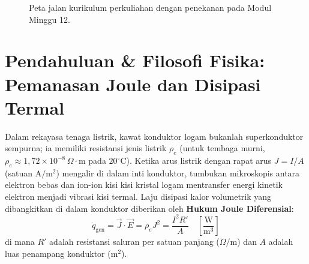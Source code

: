 \documentclass[11pt,a4paper]{article}
\theoremstyle{definition}
\begin{document}
\begin{figure}[htbp]
{%
}
\caption{Peta jalan kurikulum perkuliahan dengan penekanan pada Modul Minggu 12.}
\label{fig:peta_jalan_pd_w12}
\end{figure}

\section{Pendahuluan \& Filosofi Fisika: Pemanasan Joule dan Disipasi Termal}

Dalam rekayasa tenaga listrik, kawat konduktor logam bukanlah superkonduktor sempurna; ia memiliki resistansi jenis listrik $\rho_e$ (untuk tembaga murni, $\rho_e \approx 1{,}72 \times 10^{-8}\,\Omega\cdot\text{m}$ pada $20^\circ\text{C}$). Ketika arus listrik dengan rapat arus $J = I/A$ (satuan $\text{A}/\text{m}^2$) mengalir di dalam inti konduktor, tumbukan mikroskopis antara elektron bebas dan ion-ion kisi kisi kristal logam mentransfer energi kinetik elektron menjadi vibrasi kisi termal. Laju disipasi kalor volumetrik yang dibangkitkan di dalam konduktor diberikan oleh \textbf{Hukum Joule Diferensial}:
\begin{equation}
    \dot{q}_{\text{gen}} = \vec{J} \cdot \vec{E} = \rho_e J^2 = \frac{I^2 R'}{A}\quad \left[\frac{\text{W}}{\text{m}^3}\right]
    \label{eq:joule_heat_gen}
\end{equation}
di mana $R'$ adalah resistansi saluran per satuan panjang ($\Omega/\text{m}$) dan $A$ adalah luas penampang konduktor ($\text{m}^2$).
\end{document}
